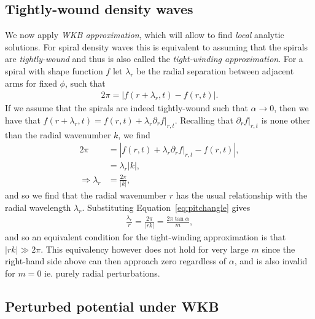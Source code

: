\subsection{Tightly-wound density waves}

We now apply \textit{WKB approximation}, which will allow to find \textit{local} analytic solutions.
For spiral density waves this is equivalent to assuming that the spirals are \textit{tightly-wound} and thus is also called the \textit{tight-winding approximation}.
For a spiral with shape function $f$ let $\lambda_r$ be the radial separation between adjacent arms for fixed $\phi$, such that
\begin{align}
    2\pi = \left| f(r+\lambda_r, t) - f(r,t) \right|.
\end{align}
If we assume that the spirals are indeed tightly-wound such that $\alpha\rightarrow 0$, then we have that $f(r+\lambda_r,t)=f(r,t) + \lambda_r \partial_r f |_{r,t}$. 
Recalling that $\partial_r f |_{r,t}$ is none other than the radial wavenumber $k$, we find
\begin{align}
    2 \pi &= \left| f(r,t) + \lambda_r \partial_r f |_{r,t} - f(r,t) \right|, \\
    &= \lambda_r | k |, \\
    \Rightarrow \lambda_r &= \frac{2 \pi}{|k|},
\end{align}
and so we find that the radial wavenumber $r$ has the usual relationship with the radial wavelength $\lambda_r$. 
Substituting Equation~\eqref{eq:pitchangle} gives
\begin{align}
    \frac{\lambda_r}{r} = \frac{2 \pi}{|rk|} =  \frac{2 \pi \tan \alpha}{m},
\end{align}
and so an equivalent condition for the tight-winding approximation is that $|rk| \gg 2 \pi$. 
This equivalency however does not hold for very large $m$ since the right-hand side above can then approach zero regardless of $\alpha$, and is also invalid for $m = 0$ ie. purely radial perturbations.

\subsection{Perturbed potential under WKB}

